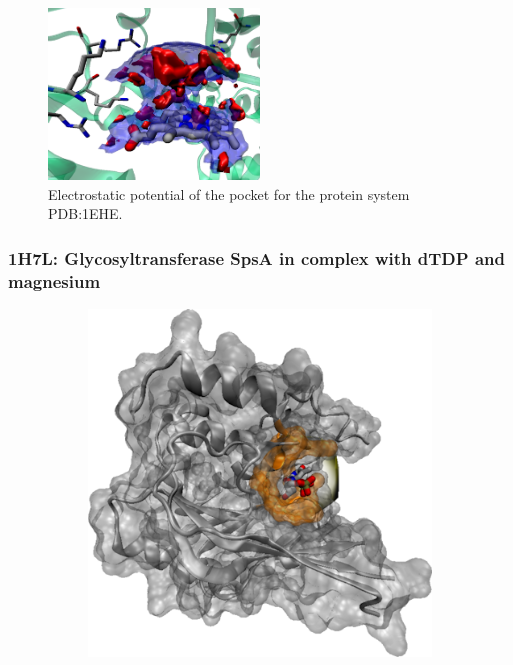       \begin{figure}[H]
        \centering
        \includegraphics[width=0.5\textwidth]{figures/results/benchmark_prot/1ehe.png}
        \caption{\label{fig:benchmark/1ehe} Electrostatic potential of the pocket for the protein system PDB:1EHE.}
      \end{figure}
    \pagebreak

    \subsubsection{1H7L: Glycosyltransferase SpsA in complex with dTDP and magnesium}
      \begin{figure}[H] \centering
        \begin{subfigure}[c]{0.3\textwidth} \centering
          \includegraphics[width=1\textwidth]{figures/results/ps_prot/1h7l.png}
        \end{subfigure}
        \begin{subfigure}[c]{0.3\textwidth} \centering
        \end{subfigure}
      \end{figure}


